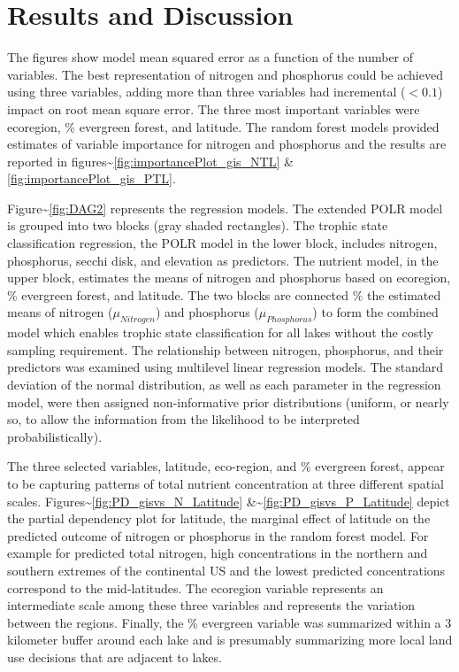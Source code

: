 \documentclass[fleqn,10pt]{wlpeerj} %
\begin{document}
\hypertarget{results-and-discussion}{%
\section{Results and Discussion}\label{results-and-discussion}}

The figures show model mean squared error as a function of the number of variables. The best representation of nitrogen and phosphorus could be achieved using three variables, adding more than three variables had incremental (\(<0.1\)) impact on root mean square error. The three most important variables were ecoregion, \% evergreen forest, and latitude. The random forest models provided estimates of variable importance for nitrogen and phosphorus and the results are reported in figures\textasciitilde{}\ref{fig:importancePlot_gis_NTL} \&\ref{fig:importancePlot_gis_PTL}.

Figure\textasciitilde{}\ref{fig:DAG2} represents the regression models. The extended POLR model is grouped into two blocks (gray shaded rectangles). The trophic state classification regression, the POLR model in the lower block, includes nitrogen, phosphorus, secchi disk, and elevation as predictors. The nutrient model, in the upper block, estimates the means of nitrogen and phosphorus based on ecoregion, \% evergreen forest, and latitude. The two blocks are connected \% the estimated means of nitrogen (\(\mu_{Nitrogen}\)) and phosphorus (\(\mu_{Phosphorus}\)) to form the combined model which enables trophic state classification for all lakes without the costly sampling requirement. The relationship between nitrogen, phosphorus, and their predictors was examined using multilevel linear regression models. The standard deviation of the normal distribution, as well as each parameter in the regression model, were then assigned non-informative prior distributions (uniform, or nearly so, to allow the information from the likelihood to be interpreted probabilistically).

The three selected variables, latitude, eco-region, and \% evergreen forest, appear to be capturing patterns of total nutrient concentration at three different spatial scales.
Figures\textasciitilde{}\ref{fig:PD_gisvs_N_Latitude} \&\textasciitilde{}\ref{fig:PD_gisvs_P_Latitude} depict the partial dependency plot for latitude, the marginal effect of latitude on the predicted outcome of nitrogen or phosphorus in the random forest model. For example for predicted total nitrogen, high concentrations in the northern and southern extremes of the continental US and the lowest predicted concentrations correspond to the mid-latitudes. The ecoregion variable represents an intermediate scale among these three variables and represents the variation between the regions. Finally, the \% evergreen variable was summarized within a 3 kilometer buffer around each lake and is presumably summarizing more local land use decisions that are adjacent to lakes.
\end{document}
